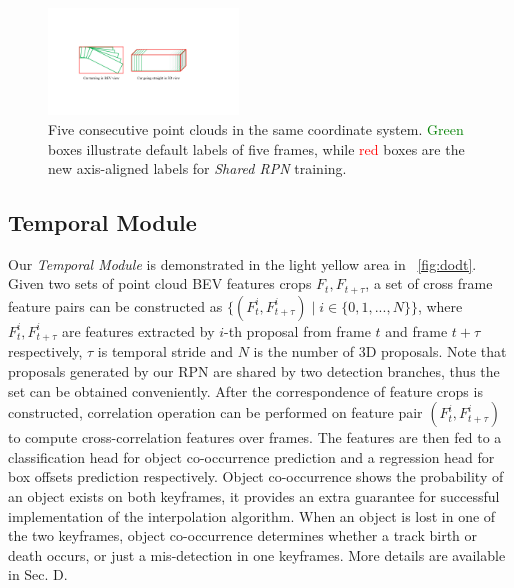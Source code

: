 \documentclass[letterpaper, 10pt, conference]{ieeeconf}  %
\begin{document}
\begin{figure}
	\rule{0pt}{1ex}
	\begin{center}
		\includegraphics[trim={7cm, 6.7cm, 7cm, 6.5cm}, clip, width=0.45\textwidth]{images/axis-aligned-boxes.pdf}
	\end{center}
	\caption{Five consecutive point clouds in the same coordinate system. \textcolor{green}{Green} boxes illustrate default labels of five frames, while \textcolor{red}{red} boxes are the new axis-aligned labels for \textit{Shared RPN} training.}
	\label{fig:integrated_boxes}
	\vspace{-0.6cm}
\end{figure}

\subsection{Temporal Module}
Our \textit{Temporal Module} is demonstrated in the light yellow area in \figurename \, \ref{fig:dodt}. Given two sets of point cloud BEV features crops $F_t, F_{t+\tau}$, a set of cross frame feature pairs can be constructed as $\{(F_t^i, F_{t+\tau}^i)\mid i \in \{0,1,...,N\}\}$, where $F_t^i, F_{t+\tau}^i$ are features extracted by $i$-th proposal from frame $t$ and frame $t+\tau$ respectively, $\tau$ is temporal stride and $N$ is the number of 3D proposals. Note that proposals generated by our RPN are shared by two detection branches, thus the set can be obtained conveniently. After the correspondence of feature crops is constructed, correlation operation can be performed on feature pair $(F_t^i, F_{t+\tau}^i)$ to compute cross-correlation features over frames. The features are then fed to a classification head for object co-occurrence prediction and a regression head for box offsets prediction respectively. Object co-occurrence shows the probability of an object exists on both keyframes, it provides an extra guarantee for successful implementation of the interpolation algorithm. When an object is lost in one of the two keyframes, object co-occurrence determines whether a track birth or death occurs, or just a mis-detection in one keyframes. More details are available in Sec. D.
\end{document}
